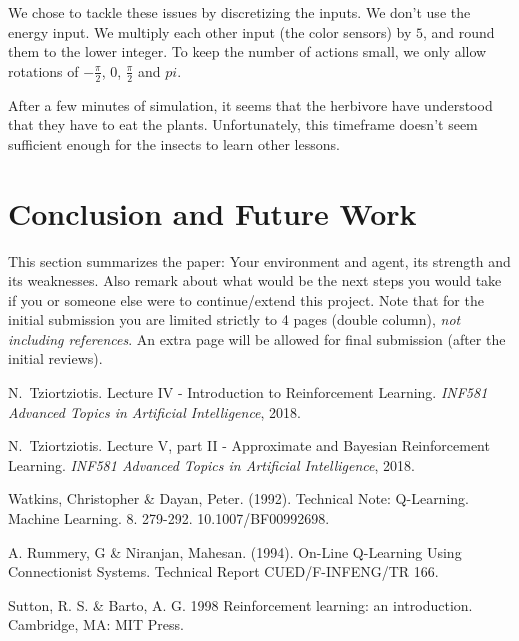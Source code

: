 \documentclass[journal, a4paper]{IEEEtran}
\begin{document}
We chose to tackle these issues by discretizing the inputs.
We don't use the energy input.
We multiply each other input (the color sensors) by $5$, and round them to the lower integer.
To keep the number of actions small, we only allow rotations of $-\frac{\pi}{2}$, $0$, $\frac{\pi}{2}$ and $pi$.

After a few minutes of simulation, it seems that the herbivore have understood that they have to eat the plants.
Unfortunately, this timeframe doesn't seem sufficient enough for the insects to learn other lessons.

\section{Conclusion and Future Work}
	This section summarizes the paper: Your environment and agent, its strength and its weaknesses. Also remark about what would be the next steps you would take if you or someone else were to continue/extend this project. 
	Note that for the initial submission you are limited strictly to 4 pages (double column), \emph{not including references}. An extra page will be allowed for final submission (after the initial reviews). 

\begin{thebibliography}{4}

	N.~Tziortziotis. Lecture IV - Introduction to Reinforcement Learning. \textit{INF581 Advanced Topics in Artificial Intelligence}, 2018.

	N.~Tziortziotis. Lecture V, part II - Approximate and Bayesian Reinforcement Learning. \textit{INF581 Advanced Topics in Artificial Intelligence}, 2018.

	Watkins, Christopher \& Dayan, Peter. (1992). Technical Note: Q-Learning. Machine Learning. 8. 279-292. 10.1007/BF00992698. 

	A. Rummery, G \& Niranjan, Mahesan. (1994). On-Line Q-Learning Using Connectionist Systems. Technical Report CUED/F-INFENG/TR 166. 

    Sutton, R. S. \& Barto, A. G. 1998 Reinforcement learning: an introduction. Cambridge, MA: MIT Press.

\end{thebibliography}
\end{document}
